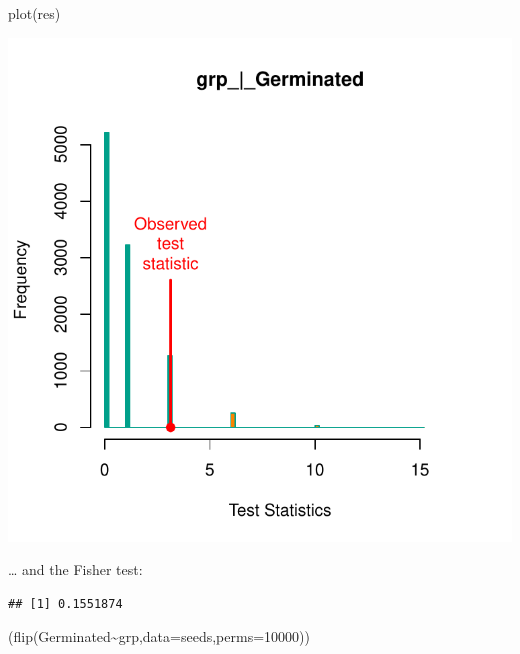 \documentclass[
]{article}
\newenvironment{Shaded}{\begin{snugshade}}{\end{snugshade}}
\newcommand{\AttributeTok}[1]{\textcolor[rgb]{0.77,0.63,0.00}{#1}}
\newcommand{\DecValTok}[1]{\textcolor[rgb]{0.00,0.00,0.81}{#1}}
\newcommand{\FunctionTok}[1]{\textcolor[rgb]{0.00,0.00,0.00}{#1}}
\newcommand{\NormalTok}[1]{#1}
\newcommand{\SpecialCharTok}[1]{\textcolor[rgb]{0.00,0.00,0.00}{#1}}
\begin{document}
\begin{Shaded}
\begin{Highlighting}[]
\FunctionTok{plot}\NormalTok{(res)}
\end{Highlighting}
\end{Shaded}

\begin{center}\includegraphics{perm_files/figure-latex/unnamed-chunk-28-1} \end{center}

\ldots{} and the Fisher test:

\begin{Shaded}
\end{Shaded}

\begin{verbatim}
## [1] 0.1551874
\end{verbatim}

\begin{Shaded}
\begin{Highlighting}[]
\NormalTok{(}\FunctionTok{flip}\NormalTok{(Germinated}\SpecialCharTok{\textasciitilde{}}\NormalTok{grp,}\AttributeTok{data=}\NormalTok{seeds,}\AttributeTok{perms=}\DecValTok{10000}\NormalTok{))}
\end{Highlighting}
\end{Shaded}
\end{document}
